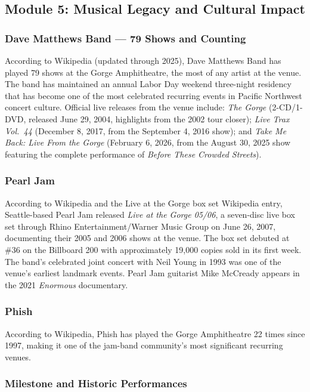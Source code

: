 \documentclass[11pt,letterpaper]{article}
\begin{document}
\subsection{Module 5: Musical Legacy and Cultural Impact}

\subsubsection{Dave Matthews Band --- 79 Shows and Counting}

According to Wikipedia (updated through 2025), Dave Matthews Band has played 79 shows at the Gorge Amphitheatre, the most of any artist at the venue. The band has maintained an annual Labor Day weekend three-night residency that has become one of the most celebrated recurring events in Pacific Northwest concert culture. Official live releases from the venue include: \textit{The Gorge} (2-CD/1-DVD, released June 29, 2004, highlights from the 2002 tour closer); \textit{Live Trax Vol.\ 44} (December 8, 2017, from the September 4, 2016 show); and \textit{Take Me Back: Live From the Gorge} (February 6, 2026, from the August 30, 2025 show featuring the complete performance of \textit{Before These Crowded Streets}).

\subsubsection{Pearl Jam}

According to Wikipedia and the Live at the Gorge box set Wikipedia entry, Seattle-based Pearl Jam released \textit{Live at the Gorge 05/06}, a seven-disc live box set through Rhino Entertainment/Warner Music Group on June 26, 2007, documenting their 2005 and 2006 shows at the venue. The box set debuted at \#36 on the Billboard 200 with approximately 19,000 copies sold in its first week. The band's celebrated joint concert with Neil Young in 1993 was one of the venue's earliest landmark events. Pearl Jam guitarist Mike McCready appears in the 2021 \textit{Enormous} documentary.

\subsubsection{Phish}

According to Wikipedia, Phish has played the Gorge Amphitheatre 22 times since 1997, making it one of the jam-band community's most significant recurring venues.

\subsubsection{Milestone and Historic Performances}
\end{document}
